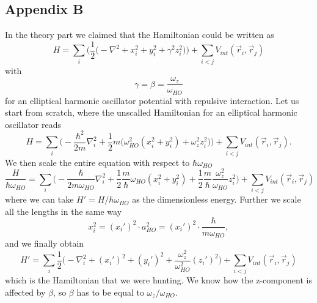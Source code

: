 \documentclass[norsk,a4paper,12pt]{article}
\begin{document}
\subsection{Appendix B}
In the theory part we claimed that the Hamiltonian could be written as
\begin{equation}
H=\sum_i\bigg(\frac{1}{2}\Big(-\nabla^2 + x_i^2 + y_i^2 + \gamma^2z_i^2\Big)\bigg)+\sum_{i<j}V_{int}(\vec{r}_i,\vec{r}_j)
\end{equation}
with
\begin{equation*}
\gamma=\beta=\frac{\omega_z}{\omega_{HO}}
\end{equation*}
for an elliptical harmonic oscillator potential with repulsive interaction. Let us start from scratch, where the unscalled Hamiltonian for an elliptical harmonic oscillator reads
\begin{equation*}
H=\sum_i\bigg(-\frac{\hbar^2}{2m}\nabla_i^2+\frac{1}{2}m\Big(\omega_{HO}^2(x_i^2+y_i^2)+\omega_z^2z_i^2\Big)\bigg)+\sum_{i<j}V_{int}(\vec{r}_i, \vec{r}_j).
\end{equation*}
We then scale the entire equation with respect to $\hbar\omega_{HO}$
\begin{equation*}
\frac{H}{\hbar\omega_{HO}}=\sum_i\bigg(-\frac{\hbar}{2m\omega_{HO}}\nabla_i^2+\frac{1}{2}\frac{m}{\hbar}\omega_{HO}(x_i^2+y_i^2)+\frac{1}{2}\frac{m}{\hbar}\frac{\omega_z^2}{\omega_{HO}}z_i^2\bigg)+\sum_{i<j}V_{int}(\vec{r}_i, \vec{r}_j)
\end{equation*}
where we can take $H'=H/\hbar\omega_{HO}$ as the dimensionless energy. Further we scale all the lengths in the same way
\begin{equation*}
x_i^2=(x_i')^2\cdot a_{HO}^2=(x_i')^2\cdot\frac{\hbar}{m\omega_{HO}},
\end{equation*}
and we finally obtain
\begin{equation}
H'=\sum_i\frac{1}{2}\bigg(-\nabla_i^2+(x_i')^2+(y_i')^2+\frac{\omega_z^2}{\omega_{HO}^2}(z_i')^2\bigg)+\sum_{i<j}V_{int}(\vec{r}_i, \vec{r}_j)
\end{equation}
which is the Hamiltonian that we were hunting. We know how the z-component is affected by $\beta$, so $\beta$ has to be equal to $\omega_z/\omega_{HO}$.
\end{document}
